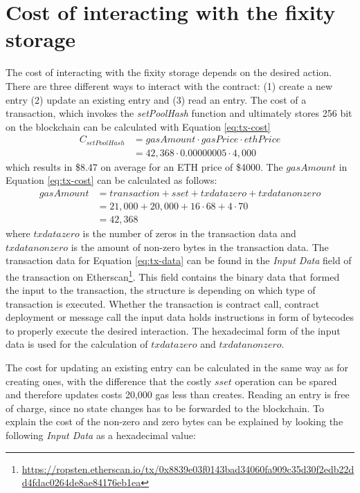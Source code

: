 \section{Cost of interacting with the fixity storage}\label{sec:cost-interating}
The cost of interacting with the fixity storage depends on the desired action. There are three different ways to interact with the contract: (1) create a new entry (2) update an existing entry and (3) read an entry.
The cost of a transaction, which invokes the \textit{setPoolHash} function and ultimately stores 256 bit on the blockchain can be calculated with Equation \ref{eq:tx-cost}
\begin{equation}\label{eq:tx-cost}
    \begin{split}
        C_{setPoolHash} & = gasAmount \cdot gasPrice \cdot ethPrice \\ 
        & = 42,368 \cdot 0.00000005 \cdot 4,000
    \end{split}
\end{equation}
which results in \$8.47 on average for an ETH price of \$4000.
The $gasAmount$ in Equation \ref{eq:tx-cost} can be calculated as follows:
\begin{equation}\label{eq:tx-data}
  \begin{split}
    gasAmount & = transaction + sset + txdatazero + txdatanonzero \\
     & = 21,000 + 20,000 + 16 \cdot 68 + 4 \cdot 70  \\
     & = 42,368
  \end{split}
\end{equation}
where $txdatazero$ is the number of zeros in the transaction data and $txdatanonzero$ is the amount of non-zero bytes in the transaction data. The transaction data for Equation \ref{eq:tx-data} can be found in the \textit{Input Data} field of the transaction on Etherscan\footnote{\url{https://ropsten.etherscan.io/tx/0x8839e03f0143bad34060fa909c35d30f2edb22dd4fdac0264de8ae84176eb1ea}}. This field contains the binary data that formed the input to the transaction, the structure is depending on which type of transaction is executed. Whether the transaction is contract call, contract deployment or message call the input data holds instructions in form of bytecodes to properly execute the desired interaction. The hexadecimal form of the input data is used for the calculation of $txdatazero$ and $txdatanonzero$.

The cost for updating an existing entry can be calculated in the same way as for creating ones, with the difference that the costly $sset$ operation can be spared and therefore updates costs 20,000 gas less than creates.
Reading an entry is free of charge, since no state changes has to be forwarded to the blockchain.
To explain the cost of the non-zero and zero bytes can be explained by looking the following \textit{Input Data} as a hexadecimal value:

